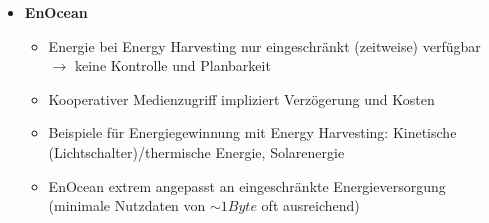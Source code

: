 \begin{itemize}
\begin{itemize}
\begin{itemize}
		\end{itemize}
	\end{itemize}
	\item \textbf{EnOcean}
	\begin{itemize}
		\item Energie bei Energy Harvesting nur eingeschränkt (zeitweise) verfügbar \(\rightarrow\) keine Kontrolle und Planbarkeit
		\item Kooperativer Medienzugriff impliziert Verzögerung und Kosten
		\item Beispiele für Energiegewinnung mit Energy Harvesting: Kinetische (Lichtschalter)/thermische Energie, Solarenergie
		\item EnOcean extrem angepasst an eingeschränkte Energieversorgung (minimale Nutzdaten von \(\sim 1 Byte\) oft ausreichend)
	\end{itemize}
\end{itemize}


